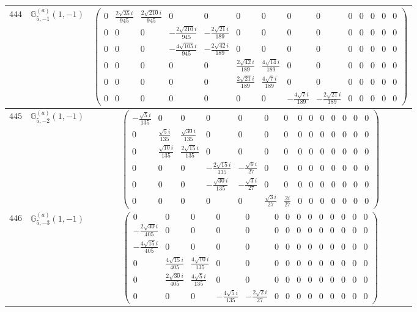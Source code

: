 \documentclass[fleqn,8pt,landscape]{jsarticle}
\begin{document}
\begin{center}
\begin{longtable}{ccc}
$ 444 $ & $ \mathbb{G}_{5,-1}^{(a)}(1,-1) $ & $ \begin{pmatrix} 0 & \frac{2 \sqrt{35} i}{945} & \frac{2 \sqrt{210} i}{945} & 0 & 0 & 0 & 0 & 0 & 0 & 0 & 0 & 0 & 0 & 0 \\ 0 & 0 & 0 & - \frac{2 \sqrt{210} i}{945} & - \frac{2 \sqrt{21} i}{189} & 0 & 0 & 0 & 0 & 0 & 0 & 0 & 0 & 0 \\ 0 & 0 & 0 & - \frac{4 \sqrt{105} i}{945} & - \frac{2 \sqrt{42} i}{189} & 0 & 0 & 0 & 0 & 0 & 0 & 0 & 0 & 0 \\ 0 & 0 & 0 & 0 & 0 & \frac{2 \sqrt{42} i}{189} & \frac{4 \sqrt{14} i}{189} & 0 & 0 & 0 & 0 & 0 & 0 & 0 \\ 0 & 0 & 0 & 0 & 0 & \frac{2 \sqrt{21} i}{189} & \frac{4 \sqrt{7} i}{189} & 0 & 0 & 0 & 0 & 0 & 0 & 0 \\ 0 & 0 & 0 & 0 & 0 & 0 & 0 & - \frac{4 \sqrt{7} i}{189} & - \frac{2 \sqrt{21} i}{189} & 0 & 0 & 0 & 0 & 0 \end{pmatrix} $ \\ \hline
$ 445 $ & $ \mathbb{G}_{5,-2}^{(a)}(1,-1) $ & $ \begin{pmatrix} - \frac{\sqrt{5} i}{135} & 0 & 0 & 0 & 0 & 0 & 0 & 0 & 0 & 0 & 0 & 0 & 0 & 0 \\ 0 & \frac{\sqrt{5} i}{135} & \frac{\sqrt{30} i}{135} & 0 & 0 & 0 & 0 & 0 & 0 & 0 & 0 & 0 & 0 & 0 \\ 0 & \frac{\sqrt{10} i}{135} & \frac{2 \sqrt{15} i}{135} & 0 & 0 & 0 & 0 & 0 & 0 & 0 & 0 & 0 & 0 & 0 \\ 0 & 0 & 0 & - \frac{2 \sqrt{15} i}{135} & - \frac{\sqrt{6} i}{27} & 0 & 0 & 0 & 0 & 0 & 0 & 0 & 0 & 0 \\ 0 & 0 & 0 & - \frac{\sqrt{30} i}{135} & - \frac{\sqrt{3} i}{27} & 0 & 0 & 0 & 0 & 0 & 0 & 0 & 0 & 0 \\ 0 & 0 & 0 & 0 & 0 & \frac{\sqrt{3} i}{27} & \frac{2 i}{27} & 0 & 0 & 0 & 0 & 0 & 0 & 0 \end{pmatrix} $ \\ \hline
$ 446 $ & $ \mathbb{G}_{5,-3}^{(a)}(1,-1) $ & $ \begin{pmatrix} 0 & 0 & 0 & 0 & 0 & 0 & 0 & 0 & 0 & 0 & 0 & 0 & 0 & 0 \\ - \frac{2 \sqrt{30} i}{405} & 0 & 0 & 0 & 0 & 0 & 0 & 0 & 0 & 0 & 0 & 0 & 0 & 0 \\ - \frac{4 \sqrt{15} i}{405} & 0 & 0 & 0 & 0 & 0 & 0 & 0 & 0 & 0 & 0 & 0 & 0 & 0 \\ 0 & \frac{4 \sqrt{15} i}{405} & \frac{4 \sqrt{10} i}{135} & 0 & 0 & 0 & 0 & 0 & 0 & 0 & 0 & 0 & 0 & 0 \\ 0 & \frac{2 \sqrt{30} i}{405} & \frac{4 \sqrt{5} i}{135} & 0 & 0 & 0 & 0 & 0 & 0 & 0 & 0 & 0 & 0 & 0 \\ 0 & 0 & 0 & - \frac{4 \sqrt{5} i}{135} & - \frac{2 \sqrt{2} i}{27} & 0 & 0 & 0 & 0 & 0 & 0 & 0 & 0 & 0 \end{pmatrix} $ \\ \hline

\end{longtable}
\end{center}
\end{document}
